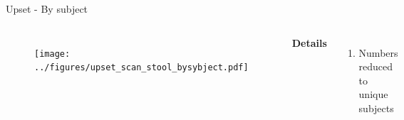 \begin{frame}{Upset - By subject}
    \begin{columns}[c] %

    
        \begin{figure}
        \texttt{[image: ../figures/upset\_scan\_stool\_bysybject.pdf]}
        \end{figure}

    
        \textbf{Details}
        \begin{enumerate}
            \item Numbers reduced to unique subjects
        \end{enumerate}

    \end{columns}

\end{frame}

